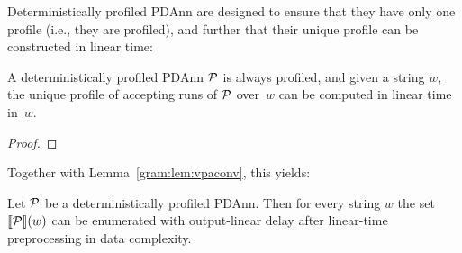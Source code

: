 %
%


%
%
%
%
%
%
%
%


%
%

%
%
%
%
%
%
%
%
%
%
%
%
%
%
%
%
%
%
%
%
%

Deterministically profiled PDAnn are designed to ensure that they have only one
profile (i.e., they are profiled), and further that their unique
profile can be constructed in linear time:

\begin{proposition}\label{gram:prp:detlinear}
  A deterministically profiled PDAnn $\mathcal{P}$ is always profiled, and given a string
  $w$, the unique profile of accepting runs of $\mathcal{P}$ over~$w$ can be computed in
  linear time in~$w$.
\end{proposition}
\begin{proof}
  
\end{proof}

Together with Lemma~\ref{gram:lem:vpaconv}, this yields:

\begin{corollary}\label{gram:cor:linear-time-pdann}
	Let $\mathcal{P}$ be a deterministically profiled PDAnn. Then for every string $w$
        the set ${\llbracket{\mathcal{P}}\rrbracket}(w)$ can be enumerated with output-linear delay after
        linear-time preprocessing in data complexity.
\end{corollary}


